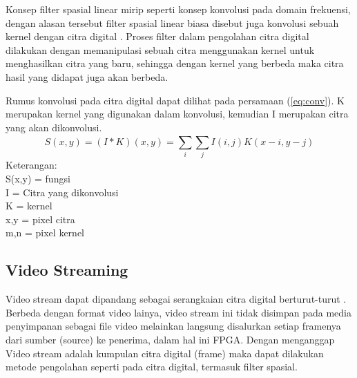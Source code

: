  Konsep filter spasial linear mirip seperti konsep konvolusi pada domain frekuensi, dengan alasan tersebut filter spasial linear biasa disebut juga konvolusi sebuah kernel dengan citra digital . Proses filter dalam pengolahan citra digital dilakukan dengan memanipulasi sebuah citra menggunakan kernel untuk menghasilkan citra yang baru, sehingga dengan kernel yang berbeda maka citra hasil yang didapat juga akan berbeda. 

Rumus konvolusi pada citra digital dapat dilihat pada persamaan (\ref{eq:conv}). K merupakan kernel yang digunakan dalam konvolusi, kemudian I merupakan citra yang akan dikonvolusi. 
\begin{equation}
    \label{eq:conv}
    S(x,y) = (I * K)(x,y) = \sum_{i}^{} \sum_{j}^{} I(i,j)K(x-i, y-j)
\end{equation}
Keterangan: \\
    \hspace{1cm} S(x,y) = fungsi \\
    \hspace{1cm}  I = Citra yang dikonvolusi \\
    \hspace{1cm} K = kernel \\
    \hspace{1cm} x,y = pixel citra \\
    \hspace{1cm} m,n = pixel kernel \\



\subsection{Video Streaming}
Video stream dapat dipandang sebagai serangkaian citra digital berturut-turut . Berbeda dengan format video lainya, video stream ini tidak disimpan pada media penyimpanan sebagai file video melainkan langsung disalurkan setiap framenya dari sumber (source) ke penerima, dalam hal ini FPGA.  Dengan menganggap Video stream adalah kumpulan citra digital (frame) maka dapat dilakukan metode pengolahan seperti pada citra digital, termasuk filter spasial. 


